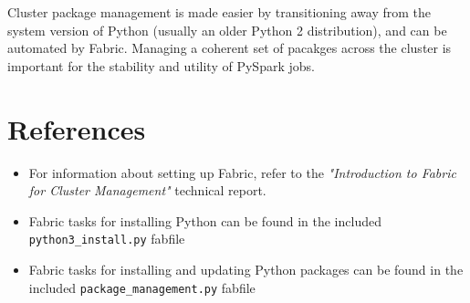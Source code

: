 \documentclass[9pt,twocolumn,twoside]{idsi}
\begin{document}
Cluster package management is made easier by transitioning away from the system version of Python (usually an older Python 2 distribution), and can be automated by Fabric. Managing a coherent set of pacakges across the cluster is important for the stability and utility of PySpark jobs.

\section*{References}
\begin{itemize}
  \item For information about setting up Fabric, refer to the \emph{"Introduction to Fabric for Cluster Management"} technical report.
  \item Fabric tasks for installing Python can be found in the included \texttt{python3\_install.py} fabfile
  \item Fabric tasks for installing and updating Python packages can be found in the included \texttt{package\_management.py} fabfile
\end{itemize}
\end{document}
